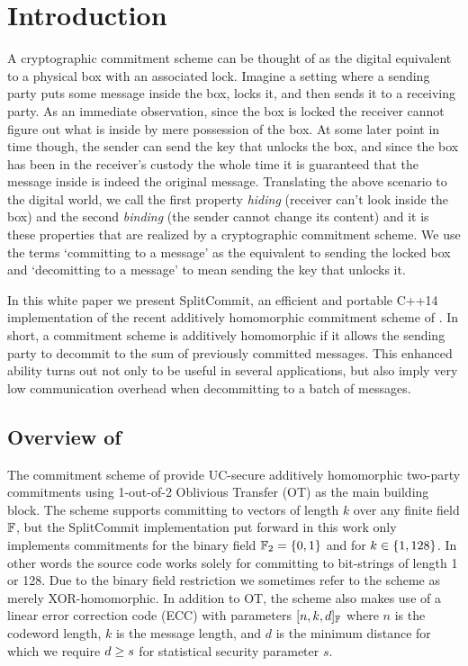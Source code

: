 \section{Introduction}

A cryptographic commitment scheme can be thought of as the digital equivalent to a  physical box with an associated lock. Imagine a setting where a sending party puts some message inside the box, locks it, and then sends it to a receiving party. As an immediate observation, since the box is locked the receiver cannot figure out what is inside by mere possession of the box. At some later point in time though, the sender can send the key that unlocks the box, and since the box has been in the receiver's custody the whole time it is guaranteed that the message inside is indeed the original message. Translating the above scenario to the digital world, we call the first property \textit{hiding} (receiver can't look inside the box) and the second \textit{binding} (the sender cannot change its content) and it is these properties that are realized by a cryptographic commitment scheme. We use the terms `committing to a message' as the equivalent to sending the locked box and `decomitting to a message' to mean sending the key that unlocks it.

In this white paper we present SplitCommit, an efficient and portable C++14 implementation of the recent additively homomorphic commitment scheme of \cite{DBLP:conf/tcc/FrederiksenJNT16}. In short, a commitment scheme is additively homomorphic if it allows the sending party to decommit to the sum of previously committed messages. This enhanced ability turns out not only to be useful in several applications, but also imply very low communication overhead when decommitting to a batch of messages.

\subsection{Overview of \cite{DBLP:conf/tcc/FrederiksenJNT16}}
The commitment scheme of \cite{DBLP:conf/tcc/FrederiksenJNT16} provide UC-secure additively homomorphic two-party commitments using 1-out-of-2 Oblivious Transfer (OT) as the main building block. The scheme supports committing to vectors of length $k$ over any finite field $\mathbb{F}$, but the SplitCommit implementation put forward in this work only implements commitments for the binary field $\mathbb{F}_2 = \left\{ 0,1 \right\}$ and for $k \in \left\{ 1,128 \right\}$. In other words the source code works solely for committing to bit-strings of length 1 or 128. Due to the binary field restriction we sometimes refer to the scheme as merely XOR-homomorphic. In addition to OT, the scheme also makes use of a linear error correction code (ECC) with parameters $[n,k,d]_{\mathbb{F}}$ where $n$ is the codeword length, $k$ is the message length, and $d$ is the minimum distance for which we require $d \geq s$ for statistical security parameter $s$.

